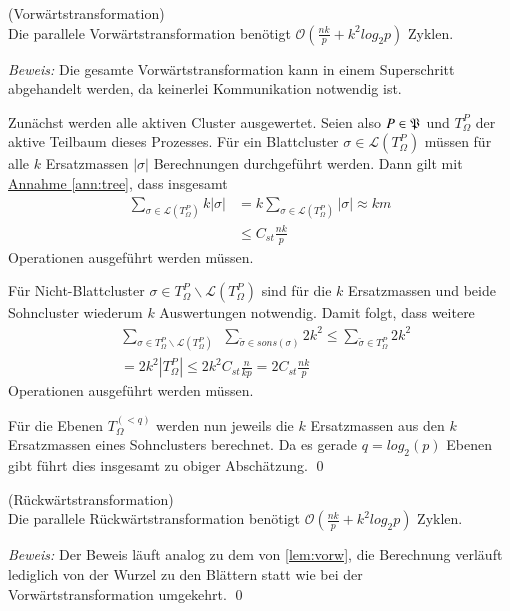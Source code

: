   \begin{lem}
  \label{lem:vorw}
    (Vorwärtstransformation)\\
    Die parallele Vorwärtstransformation benötigt $\mathcal{O}(\frac{nk}{p}+k^2log_2p)$ Zyklen.
  \end{lem}
  
  \textit{Beweis:} 
  Die gesamte Vorwärtstransformation kann in einem Superschritt abgehandelt werden, da keinerlei Kommunikation notwendig ist. 
  
  Zunächst werden alle aktiven Cluster ausgewertet. Seien also $P \in \mathfrak{P}$ und $T_\Omega^P$ der aktive Teilbaum dieses Prozesses. Für ein Blattcluster $\sigma \in \mathcal{L}(T_\Omega^P)$ müssen 
  für alle $k$ Ersatzmassen $|\sigma|$ Berechnungen durchgeführt werden.  
  Dann gilt  mit \hyperref[ann:tree]{Annahme }\ref{ann:tree}, dass insgesamt
  \begin{align*}
    \sum_{\sigma \in \mathcal{L}(T_\Omega^P)} k|\sigma| &= k\sum_{\sigma \in \mathcal{L}(T_\Omega^P)} |\sigma| \approx k m\\
    &\leq C_{st}\frac{nk}{p}
  \end{align*}
  Operationen ausgeführt werden müssen.
  
  Für Nicht-Blattcluster $\sigma \in T_\Omega^P \backslash \mathcal{L}(T_\Omega^P)$ sind für die $k$ Ersatzmassen und beide Sohncluster wiederum $k$ Auswertungen notwendig. Damit folgt, dass weitere
  \begin{align*}
    &\sum_{\sigma \in T_\Omega^P \backslash \mathcal{L}(T_\Omega^P)} \ \ \sum_{\tilde \sigma \in sons(\sigma)} 2k^2 \leq \sum_{\tilde \sigma \in T_\Omega^P} 2k^2\\
    &= 2k^2 |T_\Omega^P| \leq 2k^2 C_{st} \frac{n}{kp} = 2C_{st}\frac{nk}{p}
  \end{align*}
  Operationen ausgeführt werden müssen.
  
  Für die Ebenen $T_\Omega^{(<q)}$ werden nun jeweils die $k$ Ersatzmassen aus den $k$ Ersatzmassen eines Sohnclusters berechnet. Da es gerade $q = log_2(p)$ Ebenen gibt führt dies insgesamt zu obiger
  Abschätzung. \qed
  
  \begin{lem}
  \label{lem:ruckw}
    (Rückwärtstransformation)\\
    Die parallele Rückwärtstransformation benötigt $\mathcal{O}(\frac{nk}{p}+k^2log_2p)$ Zyklen.
  \end{lem}
  
  \textit{Beweis:}
  Der Beweis läuft analog zu dem von \autoref{lem:vorw}, die Berechnung verläuft lediglich von der Wurzel zu den Blättern statt wie bei der Vorwärtstransformation umgekehrt. \qed
  
